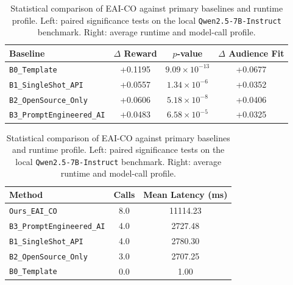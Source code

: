 \begin{table}[t]
\centering
\caption{Statistical comparison of EAI-CO against primary baselines and runtime profile. Left: paired significance tests on the local \texttt{Qwen2.5-7B-Instruct} benchmark. Right: average runtime and model-call profile.}
\label{tab:significance_cost}
\begin{minipage}[t]{0.60\textwidth}
\centering
\begin{threeparttable}
\begin{tabular}{lccc}
\toprule
Baseline & $\Delta$ Reward & $p$-value & $\Delta$ Audience Fit \\
\midrule
\texttt{B0\_Template} & +0.1195 & $9.09\times10^{-13}$ & +0.0677 \\
\texttt{B1\_SingleShot\_API} & +0.0557 & $1.34\times10^{-6}$ & +0.0352 \\
\texttt{B2\_OpenSource\_Only} & +0.0606 & $5.18\times10^{-8}$ & +0.0406 \\
\texttt{B3\_PromptEngineered\_AI} & +0.0483 & $6.58\times10^{-5}$ & +0.0325 \\
\bottomrule
\end{tabular}
\end{threeparttable}
\end{minipage}
\hfill
\begin{minipage}[t]{0.36\textwidth}
\centering
\begin{threeparttable}
\begin{tabular}{lcc}
\toprule
Method & Calls & Mean Latency (ms) \\
\midrule
\texttt{Ours\_EAI\_CO} & 8.0 & 11114.23 \\
\texttt{B3\_PromptEngineered\_AI} & 4.0 & 2727.48 \\
\texttt{B1\_SingleShot\_API} & 4.0 & 2780.30 \\
\texttt{B2\_OpenSource\_Only} & 3.0 & 2707.25 \\
\texttt{B0\_Template} & 0.0 & 1.00 \\
\bottomrule
\end{tabular}
\end{threeparttable}
\end{minipage}
\end{table}
